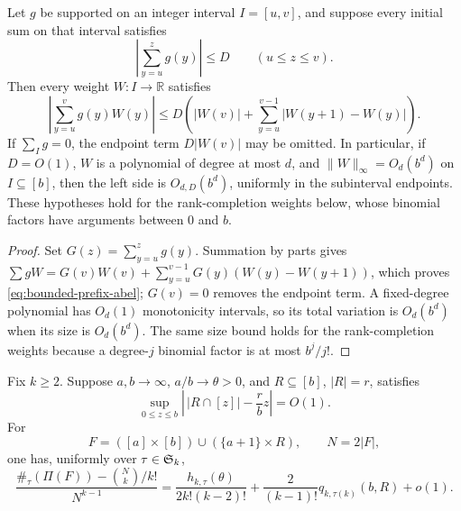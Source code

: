 \begin{lemma}\label{lem:bounded-prefix-abel}
Let $g$ be supported on an integer interval $I=[u,v]$, and suppose every
initial sum on that interval satisfies
\[
 \left|\sum_{y=u}^z g(y)\right|\le D
 \qquad (u\le z\le v).
\]
Then every weight $W:I\to\mathbb R$ satisfies
\begin{equation}\label{eq:bounded-prefix-abel}
 \left|\sum_{y=u}^v g(y)W(y)\right|
 \le D\left(|W(v)|+
       \sum_{y=u}^{v-1}|W(y+1)-W(y)|\right).
\end{equation}
If $\sum_I g=0$, the endpoint term $D|W(v)|$ may be omitted.  In
particular, if $D=O(1)$, $W$ is a polynomial of degree at most $d$, and
$\lVert W\rVert_\infty=O_d(b^d)$ on $I\subseteq[b]$, then the left side is
$O_{d,D}(b^d)$, uniformly in the subinterval endpoints.  These hypotheses
hold for the rank-completion weights below, whose binomial factors have
arguments between $0$ and $b$.
\end{lemma}

\begin{proof}
Set $G(z)=\sum_{y=u}^z g(y)$.  Summation by parts gives
$\sum gW=G(v)W(v)+\sum_{y=u}^{v-1}G(y)(W(y)-W(y+1))$,
which proves \eqref{eq:bounded-prefix-abel}; $G(v)=0$ removes the endpoint
term.  A fixed-degree polynomial has $O_d(1)$ monotonicity intervals, so
its total variation is $O_d(b^d)$ when its size is $O_d(b^d)$.  The same
size bound holds for the rank-completion weights because a degree-$j$
binomial factor is at most $b^j/j!$.
\end{proof}

\begin{proposition}\label{prop:boundary-leading}
Fix $k\ge2$.  Suppose $a,b\to\infty$, $a/b\to\theta>0$, and
$R\subseteq[b]$, $|R|=r$, satisfies
\[
 \sup_{0\le z\le b}
 \left|\,|R\cap[z]|-\frac rbz\right|=O(1).
\]
For
\[
 F=([a]\times[b])\cup(\{a+1\}\times R),
 \qquad N=2|F|,
\]
one has, uniformly over $\tau\in\mathfrak S_k$,
\begin{equation}\label{eq:boundary-leading}
 \frac{\#_\tau(\Pi(F))-\binom Nk/k!}{N^{k-1}}
 =\frac{h_{k,\tau}(\theta)}{2k!(k-2)!}
  +\frac{2}{(k-1)!}q_{k,\tau(k)}(b,R)+o(1).
\end{equation}
\end{proposition}

